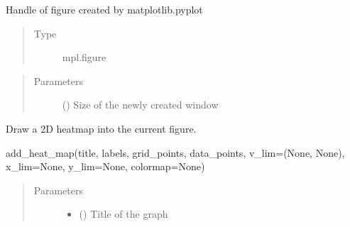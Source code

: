 \documentclass[letterpaper,10pt,english,openany,oneside]{sphinxmanual}
\begin{document}
\begin{fulllineitems}
\begin{fulllineitems}
\end{fulllineitems}


\begin{fulllineitems}
\label{\detokenize{pygpc:pygpc.Visualization.Visualization.fig}}
Handle of figure created by matplotlib.pyplot
\begin{quote}\begin{description}
\item[{Type}] \leavevmode
mpl.figure

\end{description}\end{quote}

\end{fulllineitems}

\begin{quote}\begin{description}
\item[{Parameters}] \leavevmode
{} (\sphinxstyleliteralemphasis{\sphinxupquote{, }}\sphinxstyleliteralemphasis{\sphinxupquote{, }}\sphinxstyleliteralemphasis{\sphinxupquote{(}}\sphinxstyleliteralemphasis{\sphinxupquote{,}}\sphinxstyleliteralemphasis{\sphinxupquote{)}}) \textendash{} Size of the newly created window

\end{description}\end{quote}

\begin{fulllineitems}
\label{\detokenize{pygpc:pygpc.Visualization.Visualization.add_heat_map}}
Draw a 2D heatmap into the current figure.

add\_heat\_map(title, labels, grid\_points, data\_points, v\_lim=(None, None), x\_lim=None, y\_lim=None, colormap=None)
\begin{quote}\begin{description}
\item[{Parameters}] \leavevmode\begin{itemize}
\item {} 
 () \textendash{} Title of the graph


\end{itemize}
\end{description}
\end{quote}
\end{fulllineitems}
\end{fulllineitems}
\end{document}
